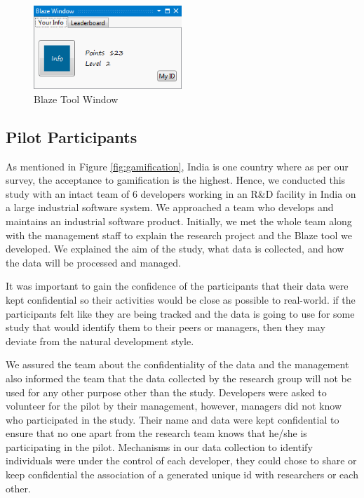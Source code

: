 \documentclass{sig-alternate}
\begin{document}
\begin{figure}
	\centering
	\includegraphics[width=2.2in]{blazeWindow.png}
	\caption{Blaze Tool Window}
	\label{fig:blazeWindow}
\end{figure}

\subsection{Pilot Participants}

As mentioned in Figure \ref{fig:gamification}, India is one country where as per our survey, the acceptance to gamification is the highest. Hence, we conducted this study with an intact team of 6 developers working in an R\&D facility in India on a large industrial software system. We approached a team who develops and maintains an industrial software product. Initially, we met the whole team along with the management staff to explain the research project and the Blaze tool we developed. We  explained the aim of the study, what data is collected, and how the data will be processed and managed. 

It was important to gain the confidence of the participants that their data were kept confidential so their activities would be close as possible to real-world. if the participants felt like they are being tracked and the data is going to use for some study that would identify them to their peers or managers, then they may deviate from the natural development style.

We  assured the team about the confidentiality of the data and the management also informed the team that the data collected by the research group will not be used for any other purpose other than the study.  Developers were asked to volunteer for the pilot by their management, however, managers did not know who participated in the study. Their name and data were kept confidential to ensure that no one apart from the research team knows that he/she is participating in the pilot. Mechanisms in our data collection to identify individuals were under the control of each developer, they could chose to share or keep confidential the association of a generated unique id with researchers or each other.   
\end{document}
